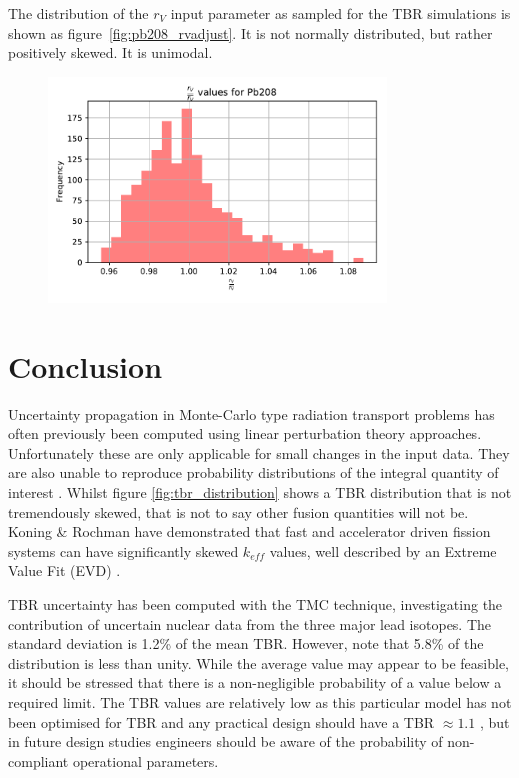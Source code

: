 The distribution of the $r_{V}$ input parameter as sampled for the TBR simulations is shown as figure~\ref{fig:pb208_rvadjust}. It is not normally distributed, but rather positively skewed. It is unimodal. 

\begin{figure}[H]
  \centering
	\includegraphics[width=0.8\textwidth]{rvadjust_param_Pb208_histogram}
	\caption{}
	\label{fig:pb208_rvadjust_hist}
\end{figure}


\section{Conclusion}
Uncertainty propagation in Monte-Carlo type radiation transport problems has often previously been computed using linear perturbation theory approaches. Unfortunately these are only applicable for small changes in the input data. They are also unable to reproduce probability distributions of the integral quantity of interest \cite{Rising2012}. Whilst figure \ref{fig:tbr_distribution} shows a TBR distribution that is not tremendously skewed, that is not to say other fusion quantities will not be. Koning \& Rochman have demonstrated that fast and accelerator driven fission systems can have significantly skewed $k_{eff}$ values, well described by an Extreme Value Fit (EVD) \cite{Koning2008}.

TBR uncertainty has been computed with the TMC technique, investigating the contribution of uncertain nuclear data from the three major lead isotopes. The standard deviation is 1.2\% of the mean TBR. However, note that 5.8\% of the distribution is less than unity. While the average value may appear to be feasible, it should be stressed that there is a non-negligible probability of a value below a required limit. The TBR values are relatively low as this particular model has not been optimised for TBR and any practical design should have a TBR $\approx 1.1$ \cite{Fischer2015}, but in future design studies engineers should be aware of the probability of non-compliant operational parameters. 

